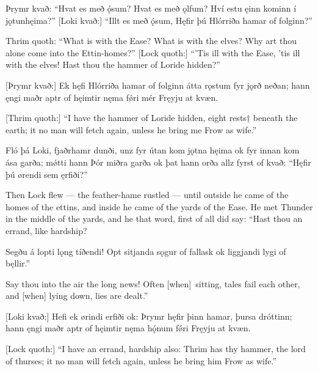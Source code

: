 Þrymr kvað:
“Hvat es með ǫ́sum? \hld Hvat es með ǫlfum?
Hví estu ęinn kominn \hld í jǫtunhęima?”
[Loki kvað:]
“Illt es með ǫ́sum, \footnotemark[1]
Hęfir þú Hlórriða \hld hamar of folginn?”

Thrim quoth:
“What is with the Ease? What is with the elves? Why art thou alone come into the Ettin-homes?”
[Lock quoth:]
“'Tis ill with the Ease, 'tis ill with the elves! Hast thou the hammer of Loride hidden?”

[Þrymr kvað:]
Ek hęfi Hlórriða \hld hamar of folginn
átta rǫstum \hld fyr jǫrð neðan;
hann ęngi maðr \hld aptr of hęimtir
nęma fǿri mér \hld Fręyju at kvæn.

[Thrim quoth:]
“I have the hammer of Loride hidden, eight rests† beneath the earth; it no man will fetch again, unless he bring me Frow as wife.”

Fló þá Loki, \hld fjaðrhamr dunði,
unz fyr útan kom \hld jǫtna hęima
ok fyr innan kom \hld ása garða;
mǿtti hann Þór \hld miðra garða
ok þat hann orða \hld allz fyrst of kvað:
“Hęfir þú ørendi \hld sem ęrfiði?”

Then Lock flew — the feather-hame rustled — until outside he came of the homes of the ettins, and inside he came of the yards of the Ease. He met Thunder in the middle of the yards, and he that word, first of all did say: “Hast thou an errand, like hardship?\footnotemark[1]

Segðu á lopti \hld lǫng tíðendi!
Opt sitjanda \hld sǫgur of fallask
ok liggjandi \hld lygi of bęllir.”

Say thou into the air the long news! Often [when] sitting, tales fail each other, and [when] lying down, lies are dealt.”\footnotemark[1]

[Loki kvað:]
Hefi ek ørindi \hld erfiði ok:
Þrymr hęfir þinn hamar, \hld þursa dróttinn;
hann ęngi maðr \hld aptr of hęimtir
nęma hǫ́num fǿri \hld Fręyju at kvæn.

[Lock quoth:]
“I have an errand, hardship also: Thrim has thy hammer, the lord of thurses; it no man will fetch again, unless he bring him Frow as wife.”

